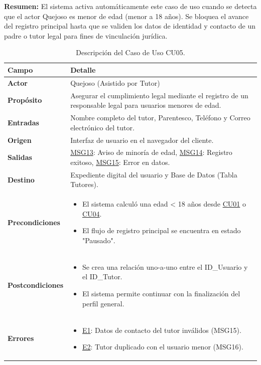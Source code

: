 \begin{appendices}
\textbf{Resumen:} 
El sistema activa automáticamente este caso de uso cuando se detecta que el actor Quejoso es menor de edad (menor a 18 años). Se bloquea el avance del registro principal hasta que se validen los datos de identidad y contacto de un padre o tutor legal para fines de vinculación jurídica.

\begin{table}[htbp]
\centering
\small
\begin{tabular}{|p{3.5cm}|p{10.5cm}|}
\hline
\rowcolor[HTML]{EFEFEF} 
\textbf{Campo} & \textbf{Detalle} \\ \hline
\textbf{Actor} & Quejoso (Asistido por Tutor) \\ \hline
\textbf{Propósito} & Asegurar el cumplimiento legal mediante el registro de un responsable legal para usuarios menores de edad. \\ \hline
\textbf{Entradas} & Nombre completo del tutor, Parentesco, Teléfono y Correo electrónico del tutor. \\ \hline
\textbf{Origen} & Interfaz de usuario en el navegador del cliente. \\ \hline
\textbf{Salidas} & \hyperlink{msg:MSG13}{MSG13}: Aviso de minoría de edad, \hyperlink{msg:MSG14}{MSG14}: Registro exitoso, \hyperlink{msg:MSG15}{MSG15}: Error en datos. \\ \hline
\textbf{Destino} & Expediente digital del usuario y Base de Datos (Tabla Tutores). \\ \hline
\textbf{Precondiciones} & 
\begin{itemize}[nosep, leftmargin=*]
    \item El sistema calculó una edad < 18 años desde \hyperlink{anexo:casos_uso}{CU01} o \hyperlink{anexo:casos_uso}{CU04}.
    \item El flujo de registro principal se encuentra en estado "Pausado".
\end{itemize} \\ \hline
\textbf{Postcondiciones} & 
\begin{itemize}[nosep, leftmargin=*]
    \item Se crea una relación uno-a-uno entre el ID\_Usuario y el ID\_Tutor.
    \item El sistema permite continuar con la finalización del perfil general.
\end{itemize} \\ \hline
\textbf{Errores} & 
\begin{itemize}[nosep, leftmargin=*]
    \item \hyperlink{err:E8}{E1}: Datos de contacto del tutor inválidos (MSG15).
    \item \hyperlink{err:E9}{E2}: Tutor duplicado con el usuario menor (MSG16).
\end{itemize} \\ \hline
\end{tabular}
\caption{Descripción del Caso de Uso CU05.}
\label{tab:cu05_especificacion}
\end{table}


\end{appendices}
